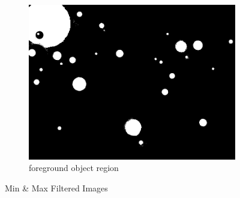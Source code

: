 \documentclass[a4paper,16pt]{article}
\begin{document}
\begin{figure}[h!]
\begin{subfigure}[h!]{0.45\linewidth}
			\includegraphics[width=\linewidth]{ballthl}
			\caption{foreground object region}
		\end{subfigure}%
		\caption{Min \& Max Filtered Images}
	\end{figure}
	\newpage
\end{document}
